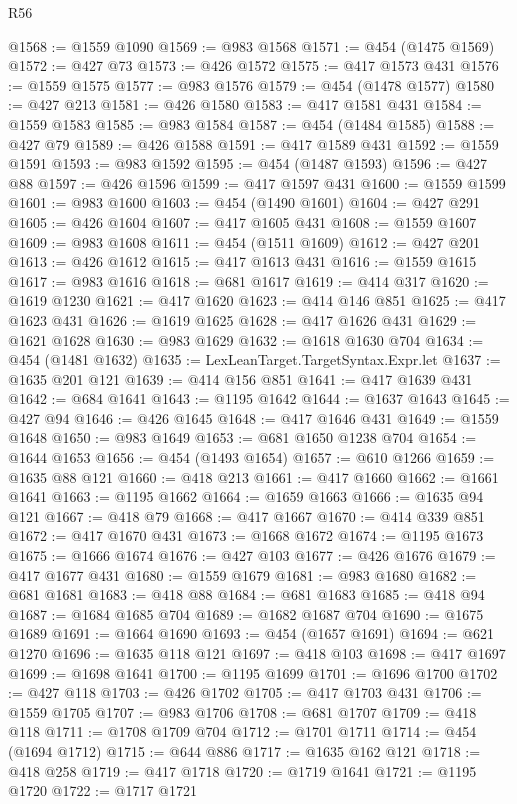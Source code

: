\begin{lexlean}{R56}
\begin{coremodule}
@1568 := @1559 @1090
@1569 := @983 @1568
@1571 := @454 (@1475 @1569)
@1572 := @427 @73
@1573 := @426 @1572
@1575 := @417 @1573 @431
@1576 := @1559 @1575
@1577 := @983 @1576
@1579 := @454 (@1478 @1577)
@1580 := @427 @213
@1581 := @426 @1580
@1583 := @417 @1581 @431
@1584 := @1559 @1583
@1585 := @983 @1584
@1587 := @454 (@1484 @1585)
@1588 := @427 @79
@1589 := @426 @1588
@1591 := @417 @1589 @431
@1592 := @1559 @1591
@1593 := @983 @1592
@1595 := @454 (@1487 @1593)
@1596 := @427 @88
@1597 := @426 @1596
@1599 := @417 @1597 @431
@1600 := @1559 @1599
@1601 := @983 @1600
@1603 := @454 (@1490 @1601)
@1604 := @427 @291
@1605 := @426 @1604
@1607 := @417 @1605 @431
@1608 := @1559 @1607
@1609 := @983 @1608
@1611 := @454 (@1511 @1609)
@1612 := @427 @201
@1613 := @426 @1612
@1615 := @417 @1613 @431
@1616 := @1559 @1615
@1617 := @983 @1616
@1618 := @681 @1617
@1619 := @414 @317
@1620 := @1619 @1230
@1621 := @417 @1620
@1623 := @414 @146 @851
@1625 := @417 @1623 @431
@1626 := @1619 @1625
@1628 := @417 @1626 @431
@1629 := @1621 @1628
@1630 := @983 @1629
@1632 := @1618 @1630 @704
@1634 := @454 (@1481 @1632)
@1635 := LexLeanTarget.TargetSyntax.Expr.let
@1637 := @1635 @201 @121
@1639 := @414 @156 @851
@1641 := @417 @1639 @431
@1642 := @684 @1641
@1643 := @1195 @1642
@1644 := @1637 @1643
@1645 := @427 @94
@1646 := @426 @1645
@1648 := @417 @1646 @431
@1649 := @1559 @1648
@1650 := @983 @1649
@1653 := @681 @1650 @1238 @704
@1654 := @1644 @1653
@1656 := @454 (@1493 @1654)
@1657 := @610 @1266
@1659 := @1635 @88 @121
@1660 := @418 @213
@1661 := @417 @1660
@1662 := @1661 @1641
@1663 := @1195 @1662
@1664 := @1659 @1663
@1666 := @1635 @94 @121
@1667 := @418 @79
@1668 := @417 @1667
@1670 := @414 @339 @851
@1672 := @417 @1670 @431
@1673 := @1668 @1672
@1674 := @1195 @1673
@1675 := @1666 @1674
@1676 := @427 @103
@1677 := @426 @1676
@1679 := @417 @1677 @431
@1680 := @1559 @1679
@1681 := @983 @1680
@1682 := @681 @1681
@1683 := @418 @88
@1684 := @681 @1683
@1685 := @418 @94
@1687 := @1684 @1685 @704
@1689 := @1682 @1687 @704
@1690 := @1675 @1689
@1691 := @1664 @1690
@1693 := @454 (@1657 @1691)
@1694 := @621 @1270
@1696 := @1635 @118 @121
@1697 := @418 @103
@1698 := @417 @1697
@1699 := @1698 @1641
@1700 := @1195 @1699
@1701 := @1696 @1700
@1702 := @427 @118
@1703 := @426 @1702
@1705 := @417 @1703 @431
@1706 := @1559 @1705
@1707 := @983 @1706
@1708 := @681 @1707
@1709 := @418 @118
@1711 := @1708 @1709 @704
@1712 := @1701 @1711
@1714 := @454 (@1694 @1712)
@1715 := @644 @886
@1717 := @1635 @162 @121
@1718 := @418 @258
@1719 := @417 @1718
@1720 := @1719 @1641
@1721 := @1195 @1720
@1722 := @1717 @1721

\end{coremodule}
\end{lexlean}
